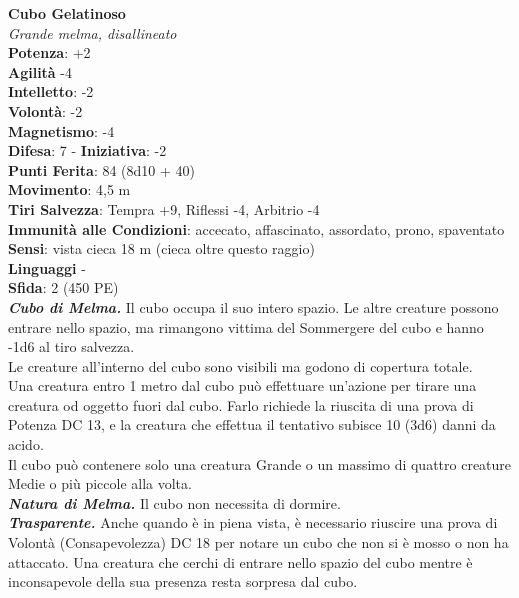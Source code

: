 \begin{multicols}{2}
\medskip\textbf{Cubo Gelatinoso}\\
\emph{Grande melma, disallineato}\\
\textbf{Potenza}: +2\\
\textbf{Agilità} -4\\
\textbf{Intelletto}: -2\\
\textbf{Volontà}: -2\\
\textbf{Magnetismo}: -4\\
\textbf{Difesa}: 7 - \textbf{Iniziativa}: -2\\
\textbf{Punti Ferita}: 84 (8d10 + 40)\\
\textbf{Movimento}: 4,5 m\\
\textbf{Tiri Salvezza}: Tempra +9, Riflessi -4, Arbitrio -4\\
\textbf{Immunità alle Condizioni}: accecato, affascinato, assordato, prono, spaventato\\
\textbf{Sensi}: vista cieca 18 m (cieca oltre questo raggio)\\
\textbf{Linguaggi} -\\
\textbf{Sfida}: 2 (450 PE)\smallskip\\
\emph{\textbf{Cubo di Melma.}} Il cubo occupa il suo intero spazio. Le altre creature possono entrare nello spazio, ma rimangono vittima del Sommergere del cubo e hanno -1d6 al tiro salvezza.\\

Le creature all'interno del cubo sono visibili ma godono di copertura totale.\\

Una creatura entro 1 metro dal cubo può effettuare un'azione per tirare una creatura od oggetto fuori dal cubo. Farlo richiede la riuscita di una prova di Potenza DC  13, e la creatura che effettua il tentativo subisce 10 (3d6) danni da acido.\\

Il cubo può contenere solo una creatura Grande o un massimo di quattro creature Medie o più piccole alla volta.\\

\emph{\textbf{Natura di Melma.}} Il cubo non necessita di dormire.\\

\emph{\textbf{Trasparente.}} Anche quando è in piena vista, è necessario riuscire una prova di Volontà (Consapevolezza) DC  18 per notare un cubo che non si è mosso o non ha attaccato. Una creatura che cerchi di entrare nello spazio del cubo mentre è inconsapevole della sua presenza resta sorpresa dal cubo.\\


\end{multicols}
